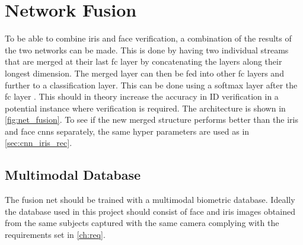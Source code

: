 \section{Network Fusion}
To be able to combine iris and face verification, a combination of the results of the two networks can be made.  This is done by having two individual streams that are merged at their last \gls{fc} layer by concatenating the layers along their longest dimension. The merged layer can then be fed into other \gls{fc} layers and further to a classification layer. This can be done using a softmax layer after the \gls{fc} layer \citep{Eitel2015}. This should in theory increase the accuracy in ID verification in a potential instance where verification is required. The architecture is shown in \autoref{fig:net_fusion}. To see if the new merged structure performs better than the iris and face \gls{cnn}s separately, the same hyper parameters are used as in \autoref{sec:cnn_iris_rec}.


\subsection{Multimodal Database}
The fusion net should be trained with a multimodal biometric database. Ideally the database used in this project should consist of face and iris images obtained from the same subjects captured with the same camera complying with the requirements set in \autoref{ch:req}. 

